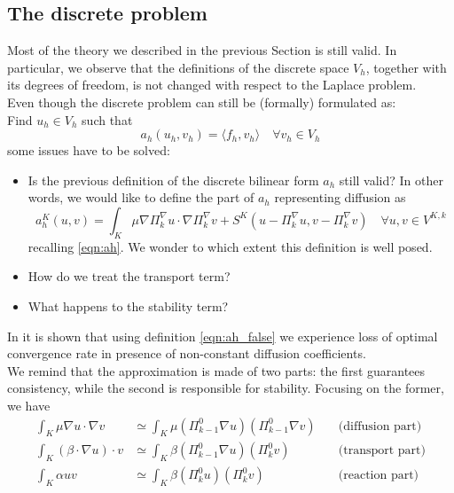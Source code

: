 \documentclass[10pt]{article}
\begin{document}
\subsection{The discrete problem}
Most of the theory we described in the previous Section is still valid. In particular, we observe that the definitions of the discrete space $V_h$, together with its degrees of freedom, is not changed with respect to the Laplace problem. \\
Even though the discrete problem can still be (formally) formulated as: \\
Find $u_h \in V_h$ such that
\begin{equation}
a_h(u_h,v_h) = \langle f_h,v_h \rangle \quad \forall v_h \in V_h
\label{eqn:discrete2}
\end{equation}
some issues have to be solved:
\begin{itemize}
	\item Is the previous definition of the discrete bilinear form $a_h$ still valid? In other words, we would like to define the part of $a_h$ representing diffusion as
	\begin{equation}
	a_h^K(u,v) = \int_K \mu \nabla \Pi_k^\nabla u \cdot \nabla \Pi_k^\nabla v+S^K(u-\Pi_k^\nabla u, v-\Pi_k^\nabla v) \quad \forall u,v \in V^{K,k}
	\label{eqn:ah_false}
	\end{equation}
	recalling \eqref{eqn:ah}. We wonder to which extent this definition is well posed.
	\item How do we treat the transport term?
	\item What happens to the stability term?
\end{itemize}
In \cite{General} it is shown that using definition \eqref{eqn:ah_false} we experience loss of optimal convergence rate in presence of non-constant diffusion coefficients. \\
We remind that the approximation is made of two parts: the first guarantees consistency, while the second is responsible for stability. Focusing on the former, we have 
\begin{subequations}
	\begin{align}
	\int_K \mu \nabla u \cdot \nabla v &\simeq \int_K \mu (\Pi^0_{k-1} \nabla u) (\Pi^0_{k-1} \nabla v)& \quad \text{(diffusion part)} \label{eqn:diffusion}
	\\
	\int_K (\beta \cdot \nabla u) \cdot v &\simeq \int_K \beta (\Pi^0_{k-1} \nabla u) (\Pi^0_{k} v) & \quad \text{(transport part)} \label{eqn:transport} \\
	\int_K \alpha u v &\simeq \int_K \beta (\Pi^0_{k} u) (\Pi^0_{k} v) & \quad \text{(reaction part)} \label{eqn:reaction}
	\end{align}
	\label{eqn:ah_elliptic}
\end{subequations}
\end{document}
